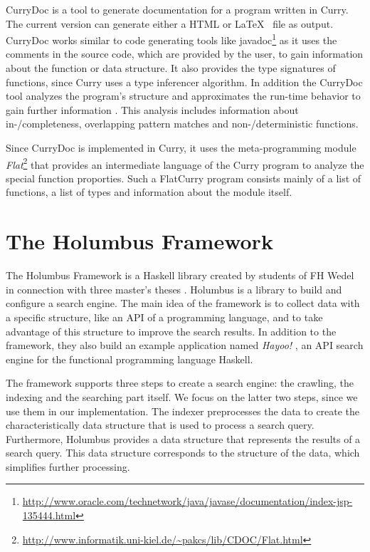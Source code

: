 \documentclass[%
	latex,%
	a4paper,%
	oneside,%
	chapterprefix,%
	headsepline,%
	12pt%
]{scrbook}
\begin{document}
CurryDoc is a tool to generate documentation for a program written in
Curry. %
The current version can generate either a HTML or \LaTeX~ file as
output. %
CurryDoc works similar to code generating tools like
javadoc\footnote{\url{http://www.oracle.com/technetwork/java/javase/documentation/index-jsp-135444.html}}
as it uses the comments in the source code, which are provided by the
user, to gain information about the function or data structure. %
It also provides the type signatures of functions, since Curry uses a
type inferencer algorithm. %
In addition the CurryDoc tool analyzes the program's structure and
approximates the run-time behavior to gain further
information \cite{currydoc2}. %
This analysis includes information about in-/completeness, overlapping
pattern matches and non-/deterministic functions. %

Since CurryDoc is implemented in Curry, it uses the meta-programming
module
\emph{Flat}\footnote{\url{http://www.informatik.uni-kiel.de/~pakcs/lib/CDOC/Flat.html}}
that provides an intermediate language of the Curry program to analyze
the special function proporties. %
Such a FlatCurry \cite{flat} program consists mainly of a list of
functions, a list of types and information about the module itself. %


\section{The Holumbus Framework}\label{preliminaries:holumbus}
The Holumbus Framework is a Haskell library created by students of FH
Wedel in connection with three master's theses \cite{searchingthesis}\cite{indexingthesis}. %
Holumbus is a library to build and configure a search engine. %
The main idea of the framework is to collect data with a specific
structure, like an API of a programming language, and to take
advantage of this structure to improve the search results. %
In addition to the framework, they also build an example application
named \emph{Hayoo!} \cite{hayoo}, an API search engine for the
functional programming language Haskell. %

The framework supports three steps to create a search engine: the
crawling, the indexing and the searching part itself. %
We focus on the latter two steps, since we use them in our
implementation. %
The indexer preprocesses the data to create the
characteristically data structure that is used to process a search
query. %
Furthermore, Holumbus provides a data structure that represents the
results of a search query. %
This data structure corresponds to the structure of the data,
which simplifies further processing. %
\end{document}
